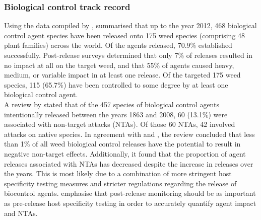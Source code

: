 \subsubsection{Biological control track record}

Using the data compiled by \citet{Winston2014BiologicalWeeds.}, \citet{schwarzlander2018biological} summarised that up to the year 2012, 468 biological control agent species have been released onto 175 weed species (comprising 48 plant families) across the world. Of the agents released, 70.9\% established successfully. Post-release surveys determined that only 7\% of releases resulted in no impact at all on the target weed, and that 55\% of agents caused heavy, medium, or variable impact in at least one release. Of the targeted 175 weed species, 115 (65.7\%) have been controlled to some degree by at least one biological control agent. \\  
A review by \citet{hinz2019safe} stated that of the 457 species of biological control agents intentionally released between the years 1863 and 2008, 60 (13.1\%) were associated with non-target attacks (NTAs). Of those 60 NTAs, 42 involved attacks on native species. In agreement with \citet{sheppard2003global} and \citet{suckling2014magnitude}, the review concluded that less than 1\% of all weed biological control releases have the potential to result in negative non-target effects. Additionally, it found that the proportion of agent releases associated with NTAs has decreased despite the increase in releases over the years. This is most likely due to a combination of more stringent host specificity testing measures and stricter regulations regarding the release of biocontrol agents. \citet{hinz2019safe} emphasise that post-release monitoring should be as important as pre-release host specificity testing in order to accurately quantify agent impact and NTAs.